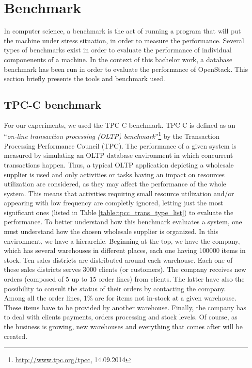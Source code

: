 

\chapter{Benchmark}
In computer science, a benchmark is the act of running a program that will put the machine under stress situation, in order to measure the performance. 
Several types of benchmarks exist in order to evaluate the performance of individual componenents of a machine. 
In the context of this bachelor work, a database benchmark has been run in order to evaluate the performance of OpenStack.
This section briefly presents the tools and benchmark used.

\section{TPC-C benchmark}
For our experiments, we used the TPC-C benchmark. 
TPC-C is defined as an \enquote{\textit{on-line transaction processing (OLTP) benchmark}}\footnote{\url{http://www.tpc.org/tpcc}, 14.09.2014} by the Transaction Processing Performance Council (TPC).
The performance of a given system is measured by simulating an OLTP database environment in which concurrent transactions happen.
Thus, a typical OLTP application depicting a wholesale supplier is used 
and only activities or tasks having an impact on resources utilization are considered, as they may affect the performance of the whole system.
This means that activities requiring small resource utilization and/or appearing with low frequency are completly ignored, 
letting just the most significant ones (listed in Table \ref{table:tpcc_trans_type_list}) to evaluate the performance.
To better understand how this benchmark evaluates a system, one must understand how the chosen wholesale supplier is organized.
In this environment, we have a hierarchie. 
Beginning at the top, we have the company, which has several warehouses in different places, each one having 100000 items in stock.
Ten sales districts are distributed around each warehouse.
Each one of these sales districts serves 3000 clients (or customers).
The company receives new orders (composed of 5 up to 15 order lines) from clients.
The latter have also the possibility to consult the status of their orders by contacting the company.
Among all the order lines, 1\% are for items not in-stock at a given warehouse.
These items have to be provided by another warehouse.
Finally, the company has to deal with clients payments, orders processing and stock levels.
Of course, as the business is growing, new warehouses and everything that comes after will be created.


